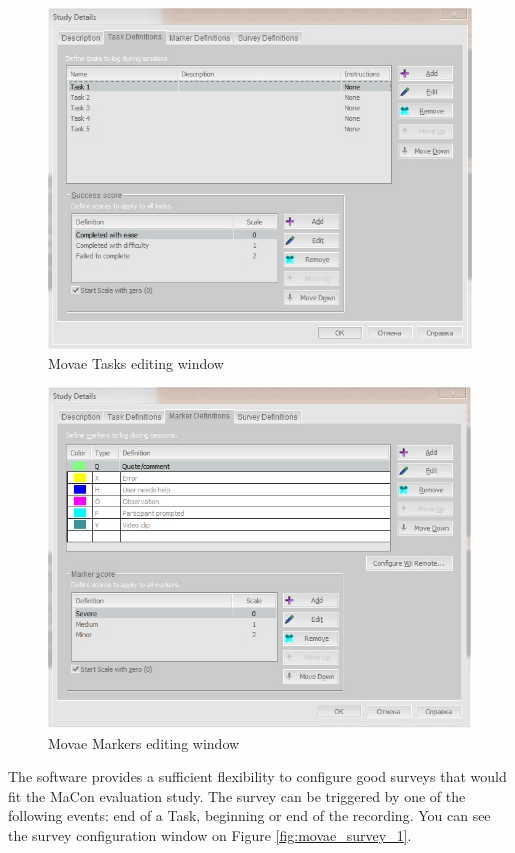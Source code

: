    \begin{figure}[htb]
 \centering
\includegraphics[width=\textwidth]{figures/movae_tasks.jpg}
\caption{Movae Tasks editing window}
\label{fig:movae_tasks}
 \end{figure}
 
    \begin{figure}[htb]
 \centering
\includegraphics[width=\textwidth]{figures/movae_markers.jpg}
\caption{Movae Markers editing window}
\label{fig:movae_markers}
 \end{figure}

The software provides a sufficient flexibility to configure good surveys that would fit the MaCon evaluation study. The survey can be triggered by one of the following events: end of a Task, beginning or end of the recording. You can see the survey configuration window on Figure \ref{fig:movae_survey_1}.\\
 

